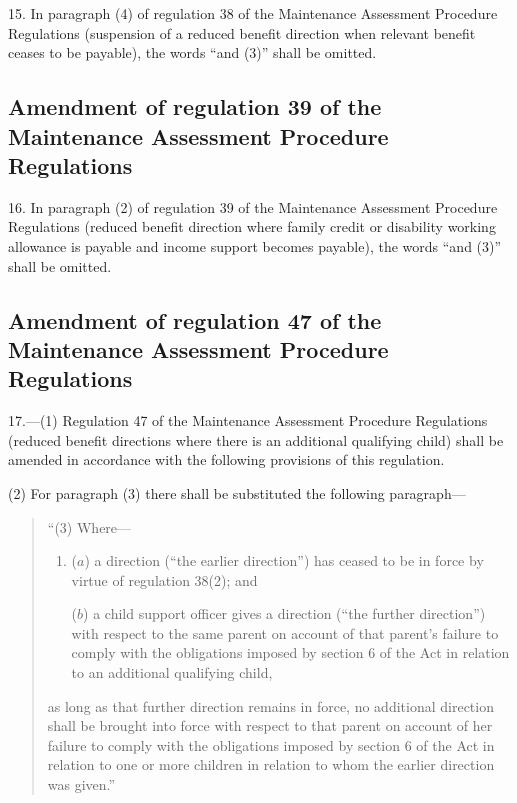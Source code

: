 \documentclass[12pt,a4paper]{article}
\begin{document}
15.  In paragraph (4) of regulation 38 of the Maintenance Assessment Procedure Regulations (suspension of a reduced benefit direction when relevant benefit ceases to be payable), the words “and (3)” shall be omitted.

\subsection[16. Amendment of regulation 39 of the Maintenance Assessment Procedure Regulations]{Amendment of regulation 39 of the Maintenance Assessment Procedure Regulations}

16.  In paragraph (2) of regulation 39 of the Maintenance Assessment Procedure Regulations (reduced benefit direction where family credit or disability working allowance is payable and income support becomes payable), the words “and (3)” shall be omitted.

\subsection[17. Amendment of regulation 47 of the Maintenance Assessment Procedure Regulations]{Amendment of regulation 47 of the Maintenance Assessment Procedure Regulations}

17.—(1) Regulation 47 of the Maintenance Assessment Procedure Regulations (reduced benefit directions where there is an additional qualifying child) shall be amended in accordance with the following provisions of this regulation.

(2) For paragraph (3) there shall be substituted the following paragraph—
\begin{quotation}
“(3) Where—
\begin{enumerate}\item[]
($a$) a direction (“the earlier direction”) has ceased to be in force by virtue of regulation 38(2); and

($b$) a child support officer gives a direction (“the further direction”) with respect to the same parent on account of that parent’s failure to comply with the obligations imposed by section 6 of the Act in relation to an additional qualifying child,
\end{enumerate}
as long as that further direction remains in force, no additional direction shall be brought into force with respect to that parent on account of her failure to comply with the obligations imposed by section 6 of the Act in relation to one or more children in relation to whom the earlier direction was given.”
\end{quotation}
\end{document}
